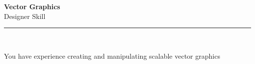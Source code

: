 \documentclass[11pt,a4paper]{memoir}
\begin{document}
    \begin{Spacing}{0.75}%
        \noindent
        \Large
        \textbf{Vector Graphics}\\[3pt]
        \scriptsize\color{gray}Designer Skill\\ 
        \rule{\textwidth}{.3mm}\\
        
        \vspace{3mm}
        \noindent
        \begin{minipage}[t]{53mm}
            \begin{flushleft}
            {
                \normalsize
                \begin{Spacing}{1}%
                \color{black}\textrm{You have experience creating and manipulating scalable vector graphics}\\
                \end{Spacing}
            }
            \end{flushleft}
        \end{minipage}

        \vspace{5mm}
        \noindent
        \begin{minipage}[t]{53mm}
            \begin{flushleft}
            {
                \normalsize
                \begin{Spacing}{1}%
                \color{gray}\textit{}\\
                \end{Spacing}
            }
            \end{flushleft}
        \end{minipage}
    \end{Spacing}
    \clearpage
\end{document}
